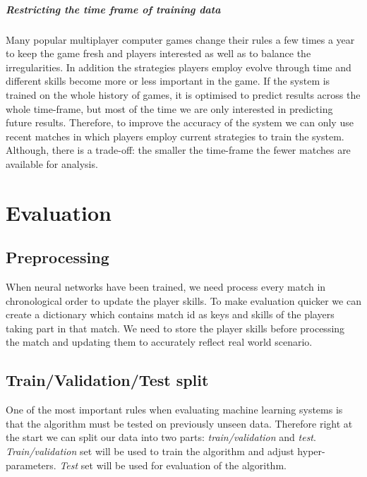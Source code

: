 \documentclass[12pt,a4paper]{book}
\begin{document}
\paragraph{Restricting the time frame of training data}
Many popular multiplayer computer games change their rules a few times a year to keep the game fresh and players interested as well as to balance the irregularities.
In addition the strategies players employ evolve through time and different skills become more or less important in the game.
If the system is trained on the whole history of games, it is optimised to predict results across the whole time-frame, but most of the time we are only interested in predicting future results.
Therefore, to improve the accuracy of the system we can only use recent matches in which players employ current strategies to train the system.
Although, there is a trade-off: the smaller the time-frame the fewer matches are available for analysis.



\chapter{Evaluation}
\section{Preprocessing}
When neural networks have been trained, we need process every match in chronological order to update the player skills.
To make evaluation quicker we can create a dictionary which contains match id as keys and skills of the players taking part in that match.
We need to store the player skills before processing the match and updating them to accurately reflect real world scenario.
\section{Train/Validation/Test split}
One of the most important rules when evaluating machine learning systems is that the algorithm must be tested on previously unseen data.
Therefore right at the start we can split our data into two parts: \emph{train/validation} and \emph{test}.
\emph{Train/validation} set will be used to train the algorithm and adjust hyper-parameters.
\emph{Test} set will be used for evaluation of the algorithm.
\end{document}
